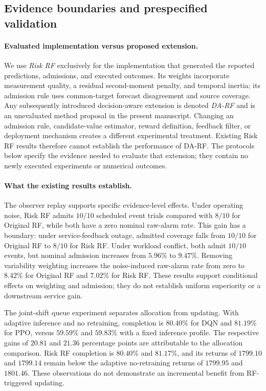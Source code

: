 \subsection{Evidence boundaries and prespecified validation}
\label{sec:validation-boundaries}

\paragraph{Evaluated implementation versus proposed extension.}
We use \emph{Risk RF} exclusively for the implementation that generated the
reported predictions, admissions, and executed outcomes. Its weights incorporate
measurement quality, a residual second-moment penalty, and temporal inertia;
its admission rule uses common-target forecast disagreement and source coverage.
Any subsequently introduced decision-aware extension is denoted
\emph{DA-RF} and is an unevaluated method proposal in the present manuscript.
Changing an admission rule, candidate-value estimator, reward definition,
feedback filter, or deployment mechanism creates a different experimental
treatment. Existing Risk RF results therefore cannot establish the performance
of DA-RF. The protocols below specify the evidence needed to evaluate that
extension; they contain no newly executed experiments or numerical outcomes.

\paragraph{What the existing results establish.}
The observer replay supports specific evidence-level effects. Under operating
noise, Risk RF admits $10/10$ scheduled event trials compared with $8/10$ for
Original RF, while both have a zero nominal raw-alarm rate. This gain has a
boundary: under service-feedback outage, admitted coverage falls from $10/10$
for Original RF to $8/10$ for Risk RF. Under workload conflict, both admit
$10/10$ events, but nominal admission increases from $5.96\%$ to $9.47\%$.
Removing variability weighting increases the noise-induced raw-alarm rate
from zero to $8.42\%$ for Original RF and $7.02\%$ for Risk RF. These results
support conditional effects on weighting and admission; they do not establish
uniform superiority or a downstream service gain.

The joint-shift queue experiment separates allocation from updating. With
adaptive inference and no retraining, completion is $80.40\%$ for DQN and
$81.19\%$ for PPO, versus $59.59\%$ and $59.83\%$ with a fixed inference
profile. The respective gains of $20.81$ and $21.36$ percentage points are
attributable to the allocation comparison. Risk RF completion is $80.40\%$
and $81.17\%$, and its returns of $1799.10$ and $1799.14$ remain below the
adaptive no-retraining returns of $1799.95$ and $1801.46$. These observations
do not demonstrate an incremental benefit from RF-triggered updating.

